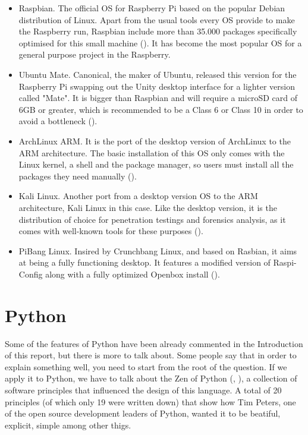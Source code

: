 	\begin{itemize}
		\item Raspbian. The official OS for Raspberry Pi based on the popular Debian distribution of Linux. Apart from the usual tools every OS provide to make the Raspberry run, Raspbian include more than 35.000 packages specifically optimised for this small machine (\cite{raspbian_main_website}). It has become the most popular OS for a general purpose project in the Raspberry. 
		\item Ubuntu Mate. Canonical, the maker of Ubuntu, released this version for the Raspberry Pi swapping out the Unity desktop interface for a lighter version called "Mate". It is bigger than Raspbian and will require a microSD card of 6GB or greater, which is recommended to be a Class 6 or Class 10 in order to avoid a bottleneck (\cite{ubuntu_mate_review}).
		\item ArchLinux ARM. It is the port of the desktop version of ArchLinux to the ARM architecture. The basic installation of this OS only comes with the Linux kernel, a shell and the package manager, so users must install all the packages they need manually (\cite{archlinux_arm_main_website}).
		\item Kali Linux. Another port from a desktop version OS to the ARM architecture, Kali Linux in this case. Like the desktop version, it is the distribution of choice for penetration testings and forensics analysis, as it comes with well-known tools for these purposes (\cite{kalilinux_website}).
		\item PiBang Linux. Insired by Crunchbang Linux, and based on Rasbian, it aims at being a fully functioning desktop. It features a modified version of Raspi-Config along with a fully optimized Openbox install (\cite{pibang_website}).
	\end{itemize} 

\section{Python}
Some of the features of Python have been already commented in the Introduction of this report, but there is more to talk about. Some people say that in order to explain something well, you need to start from the root of the question. If we apply it to Python, we have to talk about the Zen of Python (\cite{origin_zen_of_python}, \cite{zen_of_python}), a collection of software principles that influenced the design of this language. A total of 20 principles (of which only 19 were written down) that show how Tim Peters, one of the open source development leaders of Python, wanted it to be beatiful, explicit, simple among other thigs.

